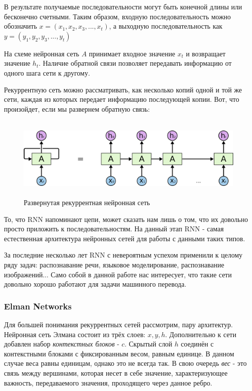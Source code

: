 	В результате получаемые последовательности могут быть конечной длины или бесконечно счетными. Таким образом, входную последовательность можно обозначить $x = (x_1, x_2, x_3, ... , x_t)$, а выходную последовательность как $y = (y_1, y_2, y_3, ... , y_t)$
	
	На схеме нейронная сеть $A$ принимает входное значение $x_t$ и возвращает значение $h_t$. Наличие обратной связи позволяет передавать информацию от одного шага сети к другому.
	
	Рекуррентную сеть можно рассматривать, как несколько копий одной и той же сети, каждая из которых передает информацию последующей копии. Вот, что произойдет, если мы развернем обратную связь:
	
	\begin{figure}[ht!]
		\centering
		\captionsetup{justification=centering}
		\includegraphics[height=40mm]{img/3.png}
		\caption{Развернутая рекуррентная нейронная сеть}
	\end{figure}
	
	То, что RNN напоминают цепи, может сказать нам лишь о том, что их довольно просто приложить к последовательностям. На данный этап RNN - самая естественная архитектура нейронных сетей для работы с данными таких типов.
	
	За последние несколько лет RNN с невероятным успехом применили к целому ряду задач: распознавание речи, языковое моделирование, распознавание изображений... Само собой в данной работе нас интересует, что такие сети довольно хорошо работают для задачи машинного перевода.
	
	\subsubsection{Elman Networks}
	
	Для большей понимания рекуррентных сетей рассмотрим, пару архитектур. Нейронная сеть Элмана состоит из трёх слоев: $x, y, h$. Дополнительно к сети добавлен набор \textit{контекстных блоков} - $c$. Скрытый слой $h$ соединён с контекстными блоками с фиксированным весом, равным единице. В данном случае веса равны единицам, однако это не всегда так. В свою очередь \textit{вес} - это связь между вершинами, которая несет в себе значение, характеризующее важность, передаваемого значения, проходящего через данное ребро. 
	
